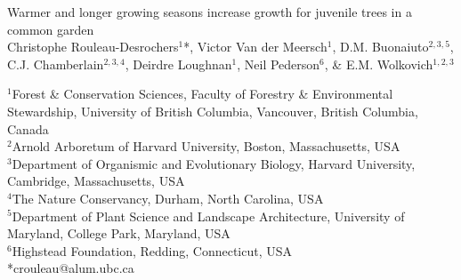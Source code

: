 \documentclass{article}\usepackage[]{graphicx}\usepackage[]{xcolor}
\begin{document}
\linenumbers
{}

\begin{center}
{\sc} {\Large Warmer and longer growing seasons increase growth for juvenile trees in a common garden} \\
\vspace{5ex}
{\sc} Christophe Rouleau-Desrochers$^1$*, Victor Van der Meersch$^1$, D.M. Buonaiuto$^{2,3,5}$, C.J. Chamberlain$^{2,3,4}$, Deirdre Loughnan$^1$, Neil Pederson$^6$, \& E.M. Wolkovich$^{1,2,3}$
\end{center}
$^1$Forest \& Conservation Sciences, Faculty of Forestry \& Environmental Stewardship, University of British Columbia, Vancouver, British Columbia, Canada\\
$^2$Arnold Arboretum of Harvard University, Boston, Massachusetts, USA\\
$^3$Department of Organismic and Evolutionary Biology, Harvard University, Cambridge, Massachusetts, USA\\
$^4$The Nature Conservancy, Durham, North Carolina, USA\\
$^5$Department of Plant Science and Landscape Architecture, University of Maryland, College Park, Maryland, USA \\
$^6$Highstead Foundation, Redding, Connecticut, USA \\
*crouleau@alum.ubc.ca

\newcommand{\Ainc}{\textit{A. incana}}
\newcommand{\Ball}{\textit{B. alleghaniensis}}
\newcommand{\Bpap}{\textit{B. papyrifera}}
\newcommand{\Bpop}{\textit{B. populifolia}}



\end{document}
